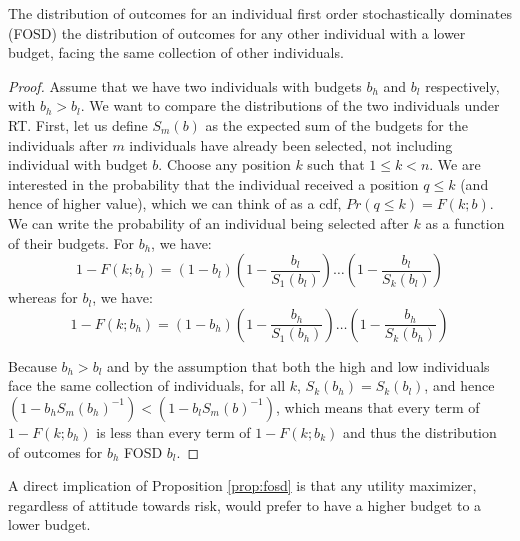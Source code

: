 \begin{proposition} \label{prop:fosd}
The distribution of outcomes for an individual first order
stochastically dominates (FOSD) the distribution of outcomes for any
other individual with a lower budget, facing the same collection of
other individuals.
\end{proposition}
\begin{proof}
  Assume that we have two individuals with budgets $b_h$ and $b_l$
  respectively, with $b_h > b_l$. We want to compare the
  distributions of the two individuals under RT. First, let us define
  $S_m(b)$ as the expected sum of the budgets for the individuals
  after $m$ individuals have already been selected, not including
  individual with budget $b$. Choose any position $k$ such that $1 \le
  k < n$.  We are interested in the probability that the individual
  received a position $q \le k$ (and hence of higher value), which we
  can think of as a cdf, $Pr(q \le k) = F(k; b)$. We can write the
  probability of an individual being selected after $k$ as a function
  of their budgets. For $b_h$, we have: 
  \begin{equation*}
    1 - F(k; b_l) = \left(1-b_l\right)\left(1-\frac{b_l}{S_1(b_l)}\right)
    \ldots \left(1 - \frac{b_l}{S_k(b_l)} \right) 
    \end{equation*} 
whereas for $b_l$, we have: 
     \begin{equation*}
    1 - F(k; b_h) = \left(1-b_h\right)\left(1-\frac{b_h}{S_1(b_h)}\right)
    \ldots \left(1 - \frac{b_h}{S_k(b_h)} \right) 
    \end{equation*} 
     
Because $b_h > b_l$ and by the assumption that both the high and low
individuals face the same collection of individuals, for all $k$,
$S_k(b_h) = S_k(b_l)$, and hence $(1-b_h S_m(b_h)^{-1}) < (1-b_l
S_m(b)^{-1})$, which means that every term of $1-F(k; b_h)$ is less
than every term of $1-F(k; b_k)$ and thus the distribution of outcomes
for $b_h$ FOSD $b_l$.
\end{proof} 

A direct implication of Proposition \ref{prop:fosd} is that any
utility maximizer, regardless of attitude towards risk, would prefer
to have a higher budget to a lower budget.


